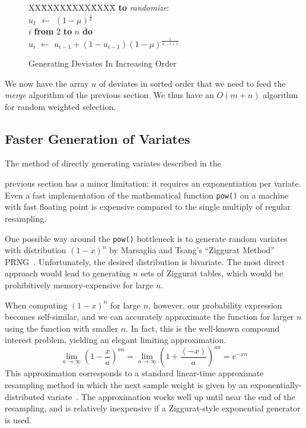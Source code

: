 \documentclass{article}
\newcommand{\asgn}{\,\,\leftarrow\,\,}
\begin{document}
  \begin{figure}
    \centering
    \begin{minipage}[b]{\linewidth}
      \begin{tabbing}
      XX\=XXXX\=XXXX\=XXXX\=\kill
      {\bf to} {\it randomize}: \\
      \>$u_1 \asgn (1-\mu)^{\frac{1}{n}}$ \\
       $i$ {\bf from} $2$ {\bf to} $n$ {\bf do} \\
      \>\>$u_i \asgn u_{i-1} + (1-u_{i-1})(1-\mu)^{\frac{1}{n-i+1}}$
    \end{tabbing}
    \end{minipage}
    \caption{Generating Deviates In Increasing Order}\label{fig:deviate}
  \end{figure}

  We now have the array $u$ of deviates in sorted order that
  we need to feed the {\em merge} algorithm of the previous
  section.  We thus have an $O(m + n)$ algorithm for random
  weighted selection.

\subsection{Faster Generation of Variates}

  The method of directly generating variates described in the

  previous section has a minor limitation: it requires an
  exponentiation per variate.  Even a fast implementation of
  the mathematical function {\tt pow()} on a machine with
  fast floating point is expensive compared to the single
  multiply of regular resampling.

  One possible way around the {\tt pow()} bottleneck is to generate
  random variates with distribution $(1 - x)^n$ by
  Marsaglia and
  Tsang's ``Ziggurat Method'' PRNG~\cite{ziggurat,ziggurat-fixes}.
  Unfortunately, the desired
  distribution is bivariate.  The most direct
  approach would lead to generating $n$ sets of Ziggurat
  tables, which would be prohibitively memory-expensive for
  large $n$.

  When computing $(1 - x)^n$ for large $n$, however, our
  probability expression becomes self-similar, and we can
  accurately approximate the function for larger $n$ using
  the function with smaller $n$.  In fact, this is the
  well-known compound interest problem, yielding an elegant
  limiting approximation.
 $$
\lim_{a \rightarrow \infty}\left(1 - \frac{x}{a}\right)^{an}
  =   \lim_{a \rightarrow \infty}\left(1 + \frac{(-x)}{a}\right)^{an}
  = e^{-xn}$$  This approximation corresponds to a standard 
  linear-time approximate resampling method in which the next sample
  weight is given by an exponentially-distributed
  variate~\cite{carpenter}.  The approximation works well up until near the
  end of the resampling, and is relatively inexpensive if a
  Ziggurat-style exponential generator is used.
\end{document}
